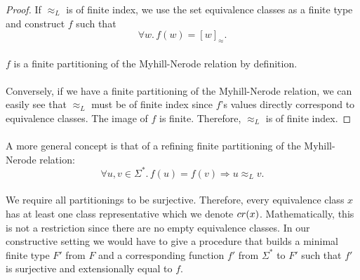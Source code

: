 \documentclass[11pt,a4paper,oneside]{book}
\begin{document}
                \begin{proof}
                    If $\approx_L$ is of finite index, we use the set equivalence classes as a finite type and construct $f$ such that
                    \[
                        \forall w.\, f(w) = [w]_\approx.
                    \]
                    \paragraph{}
                    $f$ is a finite partitioning of the Myhill-Nerode relation by definition.

                    \paragraph{}
                    Conversely, if we have a finite partitioning of the Myhill-Nerode relation, we can easily see that $\approx_L$ must be of finite index since $f$'s values directly correspond to equivalence classes. The image of $f$ is finite. Therefore, $\approx_L$ is of finite index.
                \end{proof}

            \paragraph{}

                A more general concept is that of a refining finite partitioning of the Myhill-Nerode relation:
                \[
                    \forall u, v \in \Sigma^*. \,
                    f(u) = f(v) \Rightarrow u \approx_L v.
                \]




            \paragraph{}
                We require all partitionings to be surjective.
                Therefore, every equivalence class $x$ has at least one class representative which we denote $cr(x)$.
                Mathematically, this is not a restriction since there are no empty equivalence classes.
                In our constructive setting we would have to give a procedure that builds a minimal finite type $F'$ from $F$ and a corresponding function $f'$ from $\Sigma^*$ to $F'$ such that $f'$ is surjective and extensionally equal to $f$.
\end{document}
